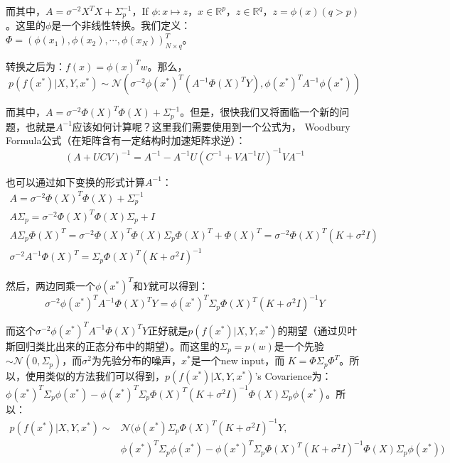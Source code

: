 \documentclass[a4paper]{article}
\begin{document}
而其中，$A = \sigma^{-2}X^TX+\Sigma_p^{-1}$，If $\phi:x\mapsto z$，$x\in \mathbb{R}^p$，$z\in\mathbb{R}^q$，$z=\phi(x)(q>p)$。这里的$\phi$是一个非线性转换。我们定义：$\Phi=(\phi(x_1),\phi(x_2),\cdots,\phi(x_N))^T_{N\times q}$。

转换之后为：$f(x) = \phi(x)^Tw$。那么，
\begin{equation}
    p(f(x^\ast)|X,Y,x^\ast) \sim \mathcal{N}(\sigma^{-2}{\phi(x^\ast)}^T(A^{-1}\Phi(X)^TY),{\phi(x^\ast)}^TA^{-1}\phi(x^\ast))
\end{equation}

而其中，$A=\sigma^{-2}\Phi(X)^T\Phi(X) + \Sigma_p^{-1}$。但是，很快我们又将面临一个新的问题，也就是$A^{-1}$应该如何计算呢？这里我们需要使用到一个公式为，{\color{red} Woodbury Formula公式（在矩阵含有一定结构时加速矩阵求逆）：
\begin{equation}
    (A+UCV)^{-1} = A^{-1}-A^{-1}U(C^{-1}+VA^{-1}U)^{-1}VA^{-1}
\end{equation}
}

也可以通过如下变换的形式计算$A^{-1}$：
\begin{gather}
    \nonumber A=\sigma^{-2}\Phi(X)^T\Phi(X) + \Sigma_p^{-1} \\
    A\Sigma_p=\sigma^{-2}\Phi(X)^T\Phi(X)\Sigma_p + I \\
    \nonumber A\Sigma_p\Phi(X)^T=\sigma^{-2}\Phi(X)^T\Phi(X)\Sigma_p \Phi(X)^T + \Phi(X)^T =  \sigma^{-2}\Phi(X)^T(K+\sigma^2I)\\
    \nonumber \sigma^{-2}A^{-1}\Phi(X)^T = \Sigma_p\Phi(X)^T(K+\sigma^2I)^{-1}
\end{gather}

然后，两边同乘一个$\phi(x^\ast)^T$和$Y$就可以得到：
\begin{equation}
    \sigma^{-2}\phi(x^\ast)^TA^{-1}\Phi(X)^TY = \phi(x^\ast)^T\Sigma_p\Phi(X)^T(K+\sigma^2I)^{-1}Y 
\end{equation}

而这个$\sigma^{-2}\phi(x^\ast)^TA^{-1}\Phi(X)^TY$正好就是$p(f(x^\ast)|X,Y,x^\ast)$的期望（通过贝叶斯回归类比出来的正态分布中的期望）。而这里的$\Sigma_p=p(w)$是一个先验$\sim \mathcal{N}(0,\Sigma_p)$，而$\sigma^2$为先验分布的噪声，$x^\ast$是一个new input，而{\color{red} $K = \Phi\Sigma_p\Phi^T$}。所以，使用类似的方法我们可以得到，$p(f(x^\ast)|X,Y,x^\ast)$'s Covarience为：$\phi(x^\ast)^T\Sigma_p\phi(x^\ast) - \phi(x^\ast)^T\Sigma_p\Phi(X)^T(K+\sigma^2I)^{-1}\Phi(X)\Sigma_p\phi(x^\ast)$。所以：
\begin{equation}
    \begin{split}
        p(f(x^\ast)|X,Y,x^\ast) \sim & \mathcal{N}(\phi(x^\ast)\Sigma_p\Phi(X)^T(K+\sigma^2I)^{-1}Y , \\ 
        & \phi(x^\ast)^T\Sigma_p\phi(x^\ast) - \phi(x^\ast)^T\Sigma_p\Phi(X)^T(K+\sigma^2I)^{-1}\Phi(X)\Sigma_p\phi(x^\ast) )    
    \end{split}
\end{equation}
\end{document}
